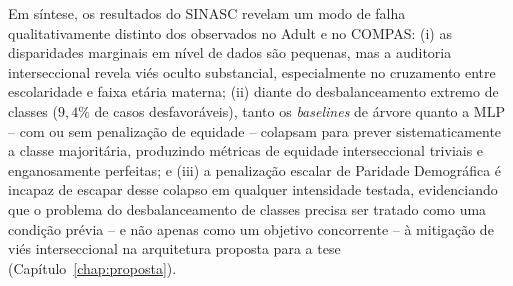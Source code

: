 Em síntese, os resultados do SINASC revelam um modo de falha qualitativamente distinto dos observados no Adult e no COMPAS: (i) as disparidades marginais em nível de dados são pequenas, mas a auditoria interseccional revela viés oculto substancial, especialmente no cruzamento entre escolaridade e faixa etária materna; (ii) diante do desbalanceamento extremo de classes ($9,4\%$ de casos desfavoráveis), tanto os \textit{baselines} de árvore quanto a MLP -- com ou sem penalização de equidade -- colapsam para prever sistematicamente a classe majoritária, produzindo métricas de equidade interseccional triviais e enganosamente perfeitas; e (iii) a penalização escalar de Paridade Demográfica é incapaz de escapar desse colapso em qualquer intensidade testada, evidenciando que o problema do desbalanceamento de classes precisa ser tratado como uma condição prévia -- e não apenas como um objetivo concorrente -- à mitigação de viés interseccional na arquitetura proposta para a tese (Capítulo~\ref{chap:proposta}).
